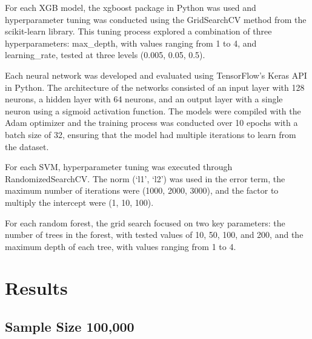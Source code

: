 \documentclass[
  man]{apa7}
\begin{document}
For each XGB model, the xgboost package in Python was used and hyperparameter tuning was conducted using the GridSearchCV method from the scikit-learn library. This tuning process explored a combination of three hyperparameters: max\_depth, with values ranging from 1 to 4, and learning\_rate, tested at three levels (0.005, 0.05, 0.5).

Each neural network was developed and evaluated using TensorFlow's Keras API in Python. The architecture of the networks consisted of an input layer with 128 neurons, a hidden layer with 64 neurons, and an output layer with a single neuron using a sigmoid activation function. The models were compiled with the Adam optimizer and the training process was conducted over 10 epochs with a batch size of 32, ensuring that the model had multiple iterations to learn from the dataset.

For each SVM, hyperparameter tuning was executed through RandomizedSearchCV. The norm (`l1', `l2') was used in the error term, the maximum number of iterations were (1000, 2000, 3000), and the factor to multiply the intercept were (1, 10, 100).

For each random forest, the grid search focused on two key parameters: the number of trees in the forest, with tested values of 10, 50, 100, and 200, and the maximum depth of each tree, with values ranging from 1 to 4.

\hypertarget{results}{%
\section{Results}\label{results}}

\hypertarget{sample-size-100000}{%
\subsection{Sample Size 100,000}\label{sample-size-100000}}
\end{document}

